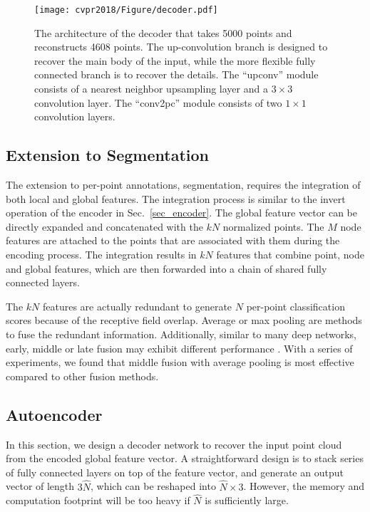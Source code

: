 \documentclass[10pt,twocolumn,letterpaper]{article}
\begin{document}
\begin{figure*}[t] \centering
\texttt{[image: cvpr2018/Figure/decoder.pdf]}
\caption{The architecture of the decoder that takes 5000 points and reconstructs 4608 points. The up-convolution branch is designed to recover the main body of the input, while the more flexible fully connected branch is to recover the details. The ``upconv'' module consists of a nearest neighbor upsampling layer and a $3\times3$ convolution layer. The ``conv2pc'' module consists of two $1\times1$ convolution layers.}\label{fig_decoder}
\vspace{-4pt}
\end{figure*}

\subsection{Extension to Segmentation} \label{sec_segmentation}
The extension to per-point annotations, \eg segmentation, requires the integration of both local and global features. The integration process is similar to the invert operation of the encoder in Sec.~\ref{sec_encoder}. The global feature vector can be directly expanded and concatenated with the $kN$ normalized points. The $M$ node features are attached to the points that are associated with them during the encoding process. The integration results in $kN$ features that combine point, node and global features, which are then forwarded into a chain of shared fully connected layers.

The $kN$ features are actually redundant to generate $N$ per-point classification scores 
because of the receptive field overlap. Average or max pooling are methods to fuse the redundant information. Additionally, similar to many deep networks, early, middle or late fusion may exhibit different performance \cite{cheng2017locality}. With a series of experiments, we found that middle fusion with average pooling is most effective compared to other fusion methods. 

\subsection{Autoencoder} \label{sec_autoencoder}

In this section, we design a decoder network to recover the input point cloud from the encoded global feature vector. A straightforward design is to stack series of fully connected layers on top of the feature vector, and generate an output vector of length $3\hat{N}$, which can be reshaped into $\hat{N}\times3$. However, the memory and computation footprint will be too heavy if $\hat{N}$ is sufficiently large.
\end{document}
